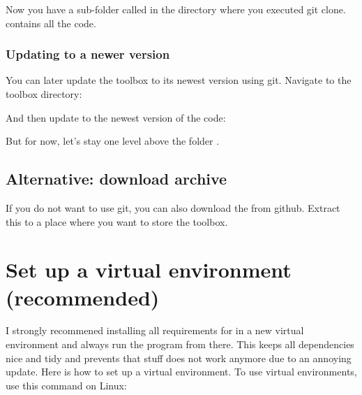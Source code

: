 \documentclass[letterpaper,10pt,english]{sphinxmanual}
\begin{document}
Now you have a sub-folder called  in the directory where you executed git clone.
 contains all the code.


\subsubsection{Updating to a newer version}
\label{\detokenize{getting_started:updating-to-a-newer-version}}\label{\detokenize{getting_started:update-git}}
You can later update the toolbox to its newest version using git.
Navigate to the toolbox directory:

%
\begin{sphinxVerbatim}[commandchars=\\\{\}]
  
\end{sphinxVerbatim}

And then update to the newest version of the code:

%
\begin{sphinxVerbatim}[commandchars=\\\{\}]
  
\end{sphinxVerbatim}

But for now, let’s stay one level above the folder .


\subsection{Alternative: download archive}
\label{\detokenize{getting_started:alternative-download-archive}}\label{\detokenize{getting_started:download-zip}}
If you do not want to use git, you can also download the  from github.
Extract this to a place where you want to store the toolbox.


\section{Set up a virtual environment (recommended)}
\label{\detokenize{getting_started:set-up-a-virtual-environment-recommended}}\label{\detokenize{getting_started:virtual-env}}
I strongly recommened installing all requirements for  in a new virtual environment and always run the program from there.
This keeps all dependencies nice and tidy and prevents that stuff does not work anymore due to an annoying update.
Here is how to set up a virtual environment.
To use virtual environments, use this command on Linux:
\end{document}
